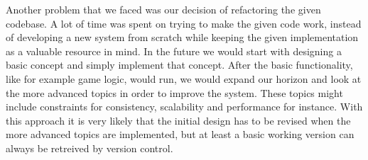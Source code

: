 Another problem that we faced was our decision of refactoring the given codebase. 
A lot of time was spent on trying to make the given code work, instead of developing a new system from scratch while keeping the given implementation as a valuable resource in mind.
In the future we would start with designing a basic concept and simply implement that concept. After the basic functionality, like for example game logic, would run, we would expand our horizon and look at the more advanced topics in order to improve the system. These topics might include constraints for consistency, scalability and performance for instance.
With this approach it is very likely that the initial design has to be revised when the more advanced topics are implemented, but at least a basic working version can always be retreived by version control.




